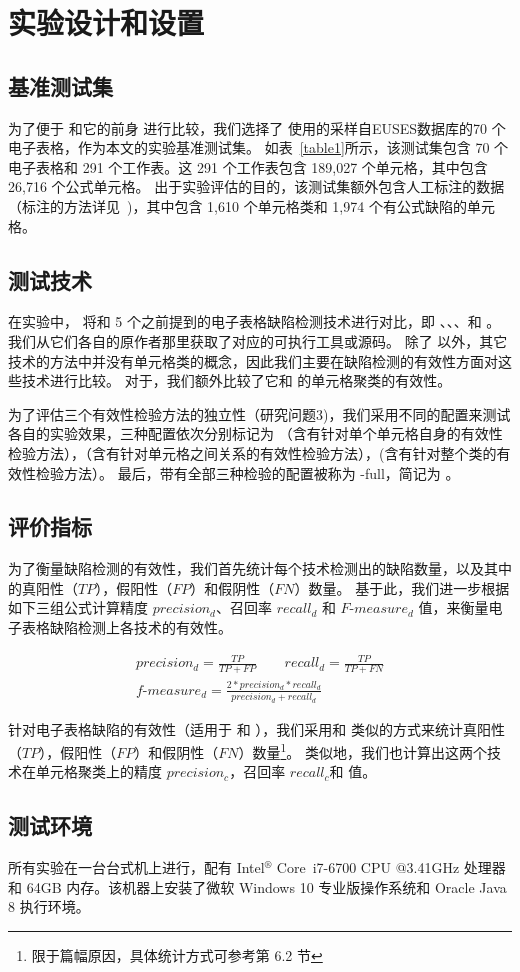 \section{实验设计和设置}


\subsection{基准测试集} 
为了便于 \wa 和它的前身 \cu 进行比较，我们选择了 \cu 使用的采样自EUSES数据库的70 个电子表格，作为本文的实验基准测试集。
如表~\ref{table1}所示，该测试集包含 70 个电子表格和 291 个工作表。这 291 个工作表包含 189,027 个单元格，其中包含 26,716 个公式单元格。
出于实验评估的目的，该测试集额外包含人工标注的数据（标注的方法详见~\cite{cheung2016custodes})，其中包含 1,610 个单元格类和 1,974 个有公式缺陷的单元格。

\subsection{测试技术} 
在实验中， \wa 将和 5 个之前提到的电子表格缺陷检测技术进行对比，即 \uc、\di、\am、\ca 和 \cu 。
我们从它们各自的原作者那里获取了对应的可执行工具或源码。
除了 \ca 以外，其它技术的方法中并没有单元格类的概念，因此我们主要在缺陷检测的有效性方面对这些技术进行比较。
对于\ca，我们额外比较了它和 \wa 的单元格聚类的有效性。

为了评估三个有效性检验方法的独立性（研究问题3)，我们采用不同的配置来测试各自的实验效果，三种配置依次分别标记为 \wasc （含有针对单个单元格自身的有效性检验方法），\wamc （含有针对单元格之间关系的有效性检验方法），\wawc (含有针对整个类的有效性检验方法）。
最后，带有全部三种检验的配置被称为 \wa-full，简记为 \wa 。

\subsection{评价指标} 
为了衡量缺陷检测的有效性，我们首先统计每个技术检测出的缺陷数量，以及其中的真阳性（$TP$），假阳性（$FP$）和假阴性（$FN$）数量。
基于此，我们进一步根据如下三组公式计算精度 $precision_d$、召回率 $recall_d$ 和 $F\text{-}measure_d$ 值\cite{yoshida2010person}，来衡量电子表格缺陷检测上各技术的有效性。

\begin{gather*}
    precision_d=\frac{TP}{TP + FP}\qquad recall_d = \frac{TP}{TP + FN}\\
    f\text{-}measure_d = \frac{2 * precision_d * recall_d}{precision_d + recall_d}
\end{gather*}

针对电子表格缺陷的有效性（适用于 \wa 和 \cu），我们采用和 \cu 类似的方式来统计真阳性（$TP$），假阳性（$FP$）和假阴性（$FN$）数量\footnote{限于篇幅原因，具体统计方式可参考\cite{cheung2016custodes}第 6.2 节}。
类似地，我们也计算出这两个技术在单元格聚类上的精度 $precision_c$，召回率 $recall_c$和 \fmc 值。

\subsection{测试环境} 
所有实验在一台台式机上进行，配有 Intel$^\circledR$ Core\texttrademark\ i7-6700 CPU @3.41GHz 处理器和 64GB 内存。该机器上安装了微软 Windows 10 专业版操作系统和 Oracle Java 8 执行环境。

